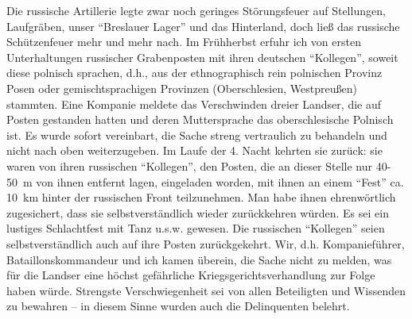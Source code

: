 \documentclass[a5paper,pagesize,10pt,twoside=true]{scrbook}
\renewcommand{\marginpar}[2][]{}
\begin{document}
\marginpar{Abschrift von Heft 2 beendet 24.11.1998}

Die russische Artillerie legte zwar noch geringes Störungsfeuer auf Stellungen, Laufgräben, unser \enquote{Breslauer Lager} und das Hinterland, doch ließ das russische Schützenfeuer mehr und mehr nach. Im Frühherbst erfuhr ich von ersten Unterhaltungen russischer Grabenposten mit ihren deutschen \enquote{Kollegen}, soweit diese polnisch sprachen, d.h., aus der ethnographisch rein polnischen Provinz Posen oder gemischtsprachigen Provinzen (Oberschlesien, Westpreußen) stammten. Eine Kompanie meldete das Verschwinden dreier Landser, die auf Posten gestanden hatten und deren Muttersprache das oberschlesische Polnisch ist. Es wurde sofort vereinbart, die Sache streng vertraulich zu behandeln und nicht nach oben weiterzugeben. Im Laufe der 4. Nacht kehrten sie zurück: sie waren von ihren russischen \enquote{Kollegen}, den Posten, die an dieser Stelle nur 40-50~m von ihnen entfernt lagen, eingeladen worden, mit ihnen an einem \enquote{Fest} ca. 10~km hinter der russischen Front teilzunehmen. Man habe ihnen ehrenwörtlich zugesichert, dass sie selbstverständlich wieder zurückkehren würden. Es sei ein lustiges Schlachtfest mit Tanz u.s.w. gewesen. Die russischen \enquote{Kollegen} seien selbstverständlich auch auf ihre Posten zurückgekehrt. Wir, d.h. Kompanieführer, Bataillonskommandeur und ich kamen überein, die Sache nicht zu melden, was für die Landser eine höchst gefährliche Kriegsgerichtsverhandlung zur Folge haben würde. Strengste Verschwiegenheit sei von allen Beteiligten und Wissenden zu bewahren -- in diesem Sinne wurden auch die Delinquenten belehrt.
\end{document}
